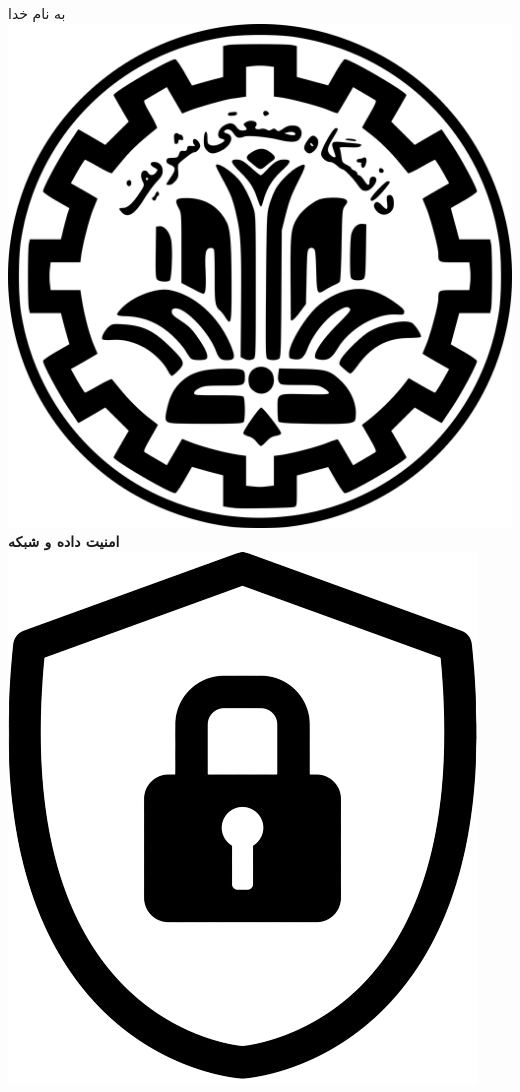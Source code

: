 \begin{center}
    به نام خدا
    \\
    \includegraphics[scale=0.02]{commons/sharif.png}
    \\
    \vspace*{5mm}
    \textbf{\Huge{امنیت داده و شبکه}}
    \hspace*{1mm}
    \vspace*{5mm}
    \includegraphics[scale=0.05]{commons/course.png}

\end{center}
